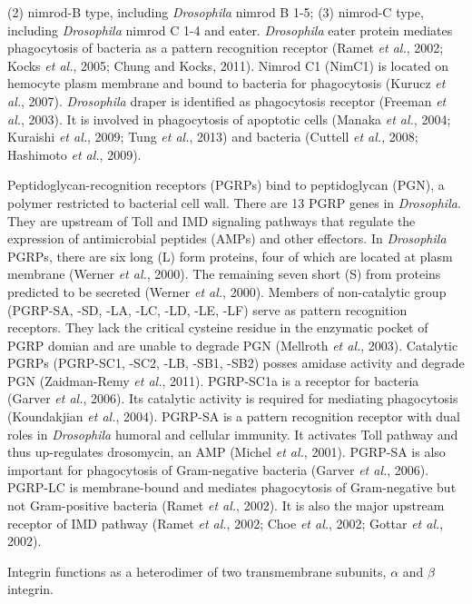 \documentclass[11pt]{article}
\begin{document}
\begin{sloppypar}
(2) nimrod-B type, including \textit{Drosophila} nimrod B 1-5; 
(3) nimrod-C type, including \textit{Drosophila} nimrod C 1-4 and eater. 
\textit{Drosophila} eater protein mediates phagocytosis of bacteria as a pattern recognition receptor (Ramet \textit{et al.}, 2002; Kocks \textit{et al.}, 2005; Chung and Kocks, 2011). 
Nimrod C1 (NimC1) is located on hemocyte plasm membrane and bound to bacteria for phagocytosis (Kurucz \textit{et al.}, 2007). 
\textit{Drosophila} draper is identified as phagocytosis receptor (Freeman \textit{et al.}, 2003).
It is involved in phagocytosis of apoptotic cells (Manaka \textit{et al.}, 2004; Kuraishi \textit{et al.}, 2009; Tung \textit{et al.}, 2013) and bacteria (Cuttell \textit{et al.}, 2008; Hashimoto \textit{et al.}, 2009).
\par
Peptidoglycan-recognition receptors (PGRPs) bind to peptidoglycan (PGN), a polymer restricted to bacterial cell wall. 
There are 13 PGRP genes in \textit{Drosophila}. 
They are upstream of Toll and IMD signaling pathways that regulate the expression of antimicrobial peptides (AMPs) and other effectors. 
In \textit{Drosophila} PGRPs, there are six long (L) form proteins, four of which are located at plasm membrane (Werner \textit{et al.}, 2000). 
The remaining seven short (S) from proteins predicted to be secreted (Werner \textit{et al.}, 2000). 
Members of non-catalytic group (PGRP-SA, -SD, -LA, -LC, -LD, -LE, -LF) serve as pattern recognition receptors. 
They lack the critical cysteine residue in the enzymatic pocket of PGRP domian and are unable to degrade PGN (Mellroth \textit{et al.}, 2003). 
Catalytic PGRPs (PGRP-SC1, -SC2, -LB, -SB1, -SB2) posses amidase activity and degrade PGN (Zaidman-Remy \textit{et al.}, 2011). 
PGRP-SC1a is a receptor for bacteria (Garver \textit{et al.}, 2006). 
Its catalytic activity is required for mediating phagocytosis (Koundakjian \textit{et al.}, 2004). 
PGRP-SA is a pattern recognition receptor with dual roles in \textit{Drosophila} humoral and cellular immunity. 
It activates Toll pathway and thus up-regulates drosomycin, an AMP (Michel \textit{et al.}, 2001). 
PGRP-SA is also important for phagocytosis of Gram-negative bacteria (Garver \textit{et al.}, 2006). 
PGRP-LC is membrane-bound and mediates phagocytosis of Gram-negative but not Gram-positive bacteria (Ramet \textit{et al.}, 2002). 
It is also the major upstream receptor of IMD pathway (Ramet \textit{et al.}, 2002; Choe \textit{et al.}, 2002; Gottar \textit{et al.}, 2002).
\par
Integrin functions as a heterodimer of two transmembrane subunits, $\alpha$ and $\beta$ integrin. 

\end{sloppypar}
\end{document}
